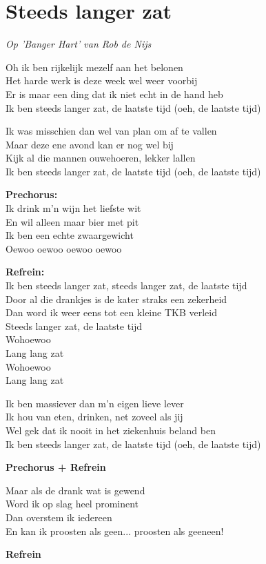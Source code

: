 \section{Steeds langer zat}
\textit{Op 'Banger Hart' van Rob de Nijs}

Oh ik ben rijkelijk mezelf aan het belonen\\
Het harde werk is deze week wel weer voorbij\\
Er is maar een ding dat ik niet echt in de hand heb\\
Ik ben steeds langer zat, de laatste tijd (oeh, de laatste tijd)

Ik was misschien dan wel van plan om af te vallen\\
Maar deze ene avond kan er nog wel bij\\
Kijk al die mannen ouwehoeren, lekker lallen\\
Ik ben steeds langer zat, de laatste tijd (oeh, de laatste tijd)

\textbf{Prechorus:}\\
Ik drink m'n wijn het liefste wit\\
En wil alleen maar bier met pit\\
Ik ben een echte zwaargewicht\\
Oewoo oewoo oewoo oewoo

\textbf{Refrein:}\\
Ik ben steeds langer zat, steeds langer zat, de laatste tijd\\
Door al die drankjes is de kater straks een zekerheid\\
Dan word ik weer eens tot een kleine TKB verleid\\
Steeds langer zat, de laatste tijd\\
Wohoewoo\\
Lang lang zat\\
Wohoewoo\\
Lang lang zat

Ik ben massiever dan m'n eigen lieve lever\\
Ik hou van eten, drinken, net zoveel als jij\\
Wel gek dat ik nooit in het ziekenhuis beland ben\\
Ik ben steeds langer zat, de laatste tijd (oeh, de laatste tijd)

\textbf{Prechorus + Refrein}

Maar als de drank wat is gewend\\
Word ik op slag heel prominent\\
Dan overstem ik iedereen\\
En kan ik proosten als geen... proosten als geeneen!

\textbf{Refrein}